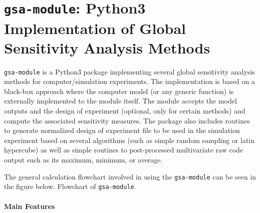 \section[\texttt{gsa-module}]{\texttt{gsa-module}: Python3 Implementation of Global Sensitivity Analysis Methods}\label{app:gsa_module}

\texttt{gsa-module} is a Python3 package implementing several global sensitivity analysis methods for computer/simulation experiments.
The implementation is based on a black-box approach where the computer model (or any generic function) is externally implemented to the module itself.
The module accepts the model outputs and the design of experiment (optional, only for certain methods) and compute the associated sensitivity measures.
The package also includes routines to generate normalized design of experiment file to be used in the simulation experiment based on several algorithms (such as simple random sampling or latin hypercube) as well as simple routines to post-processed multivariate raw code output such as its maximum, minimum, or average.

The general calculation flowchart involved in using the \texttt{gsa-module} can be seen in the figure below.
{Flowchart of \texttt{gsa-module}.}

\paragraph{Main Features}

